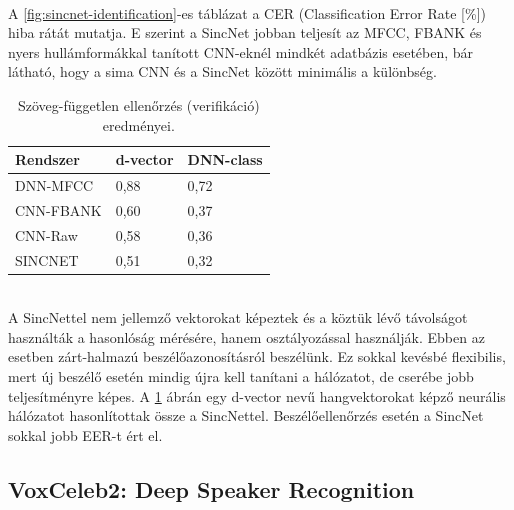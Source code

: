 \ \\
A \ref{fig:sincnet-identification}-es táblázat a CER (Classification Error Rate [\%]) hiba rátát mutatja. E szerint a SincNet jobban teljesít az MFCC, FBANK és nyers hullámformákkal tanított CNN-eknél mindkét adatbázis esetében, bár látható, hogy a sima CNN és a SincNet között minimális a különbség.
\newline
\begin{table}[!ht]
	\begin{tabular}{*3l} \toprule
		\bfseries Rendszer & \bfseries d-vector & \bfseries DNN-class \\ \midrule
		DNN-MFCC & 0,88 & 0,72 \\
		\rowcolor{gray!10} 
		CNN-FBANK & 0,60 & 0,37 \\
		CNN-Raw  & 0,58 & 0,36 \\
		\rowcolor{gray!10} 
		SINCNET & 0,51 & 0,32 \\
		\bottomrule
		\hline
	\end{tabular}
	\centering
	\caption{Szöveg-független ellenőrzés (verifikáció) eredményei.}
	\label{fig:sincnet-verification}
\end{table}
\ \\
\newline
A SincNettel nem jellemző vektorokat képeztek és a köztük lévő távolságot használták a hasonlóság mérésére, hanem osztályozással használják. Ebben az esetben zárt-halmazú beszélőazonosításról beszélünk. Ez sokkal kevésbé flexibilis, mert új beszélő esetén mindig újra kell tanítani a hálózatot, de cserébe jobb teljesítményre képes. A \ref{fig:sincnet-verification} ábrán egy d-vector nevű hangvektorokat képző neurális hálózatot hasonlítottak össze a SincNettel. Beszélőellenőrzés esetén a SincNet sokkal jobb EER-t ért el.
\newpage
\subsection{VoxCeleb2: Deep Speaker Recognition}

